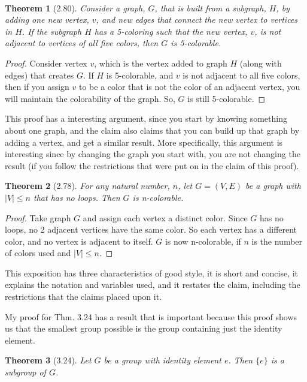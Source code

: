 \documentclass{article}
\newtheorem*{thm}{Theorem}
\begin{document}
\begin{description}
			\hfil \\

		\begin{thm}[2.80]
		  	Consider a graph, $G$, that is built from a subgraph, $H$, by adding one new vertex, $v$, and new edges that connect the new vertex to vertices in $H$.
			If the subgraph $H$ has a 5-coloring such that the new vertex, $v$, is 
			not adjacent to vertices of all five colors, then $G$ is 5-colorable.
		\end{thm}
		\begin{proof}
			Consider vertex $v$, which is the vertex added to graph $H$ (along with edges) that creates $G$. If $H$ is 5-colorable, and $v$ is not adjacent to all five colors, then if you assign $v$ to be a color
			that is not the color of an adjacent vertex, you will maintain the colorability of the graph. So, $G$ is still 5-colorable.
		 \end{proof}
			This proof has a interesting argument, since you start by knowing something about one graph, and the claim also claims
			that you can build up that graph by adding a vertex, and get a similar result. More specifically, this argument
			is interesting since by changing the graph you start with, you are not changing the result (if you follow the restrictions
			that were put on in the claim of this proof). 


		\begin{thm}[2.78]
		  	For any natural number, $n$, let $G = (V,E)$ be a graph with $|V| \leq n$ that has no loops. Then $G$ is n-colorable. 
	      \end{thm}
	      \begin{proof}
			Take graph $G$ and assign each vertex a distinct color. Since $G$ has no loops, no 2 adjacent vertices have the same color.
			So each vertex has a different color, and no vertex is adjacent to itself. 
			$G$ is now n-colorable, if $n$ is the number of colors used and $|V| \leq n$. 
	      \end{proof}
			This exposition has three characteristics of good style, it is short and concise, it explains the notation and variables used,
			and it restates the claim, including the restrictions that the claims placed upon it.


My proof for Thm. 3.24 has a result that is important because this proof shows us that the smallest group possible is the group
		containing just the identity element. 
	  \begin{thm}[3.24]
	      	Let $G$ be a group with identity element $e$. Then $\{e\}$ is a subgroup of $G$. 


\end{thm}
\end{description}
\end{document}
